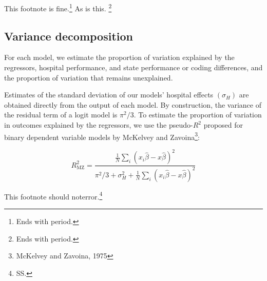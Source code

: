 \documentclass{article}
\begin{document}
This footnote is fine.\footnote{Ends with period.}
As is this.%
	\footnote{Ends with period.}
	
	\subsection{Variance decomposition}\label{subsec:variance-decomposition}

For each model, we estimate the proportion of variation explained by the regressors, hospital performance, and state performance or coding differences, and the proportion of variation that remains unexplained.

Estimates of the standard deviation of our models' hospital effects \((\sigma_{H})\) are obtained directly from the output of each model.
By construction, the variance of the residual term of a logit model is \(\pi^2/3\).
To estimate the proportion of variation in outcomes explained by the regressors, we use the pseudo-\(R^2\) proposed for binary dependent variable models by McKelvey and Zavoina\footnote{McKelvey and Zavoina, 1975}:

\[R_{\text{MZ}}^{2} = \frac{\frac{1}{N}\sum_{i} (x_{i}\hat{\beta} - x\hat{\beta})^{2}}{\pi^2/3 + \sigma_{H}^{2} + \frac{1}{N}\sum_{i}^{}(x_{i}\hat{\beta} - x\hat{\beta})^2}\]

This footnote should noterror.\footnote{SS.}
\end{document}
